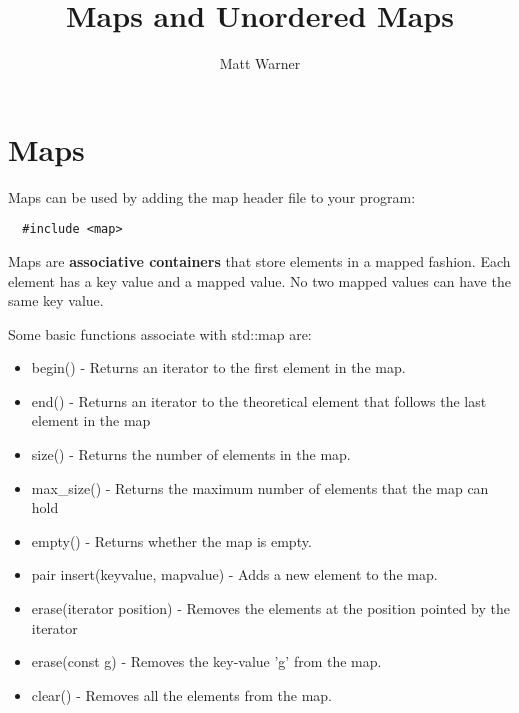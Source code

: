 \documentclass{report}
\title{\Huge{Maps and Unordered Maps}}
\author{\huge{Matt Warner}}
\date{\huge{}}
\begin{document}
  \maketitle
  \section{Maps} 
  Maps can be used by adding the map header file to your program:
  \begin{verbatim}
  #include <map>
  \end{verbatim}
\bigbreak \noindent
Maps are \textbf{associative containers} that store elements in a mapped fashion. Each element has a key value and a mapped value. No two mapped values can have the same key value.
\begin{mdframed}
 Some basic functions associate with std::map are: 
 \bigbreak \noindent
 \begin{itemize}
   \item begin() - Returns an iterator to the first element in the map. 
   \item end() - Returns an iterator to the theoretical element that follows the last element in the map
   \item size() - Returns the number of elements in the map.
   \item max\_size() - Returns the maximum number of elements that the map can hold
   \item empty() - Returns whether the map is empty.
   \item pair insert(keyvalue, mapvalue)  - Adds a new element to the map.
   \item erase(iterator position) - Removes the elements at the position pointed by the iterator
   \item erase(const g) - Removes the key-value 'g' from the map.
   \item clear() - Removes all the elements from the map.
 \end{itemize}
\end{mdframed}
\bigbreak \noindent
\end{document}
